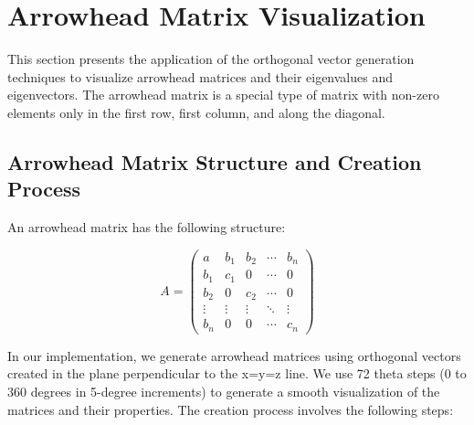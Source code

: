 \newpage\section{Arrowhead Matrix Visualization}

This section presents the application of the orthogonal vector generation techniques to visualize arrowhead matrices and their eigenvalues and eigenvectors. The arrowhead matrix is a special type of matrix with non-zero elements only in the first row, first column, and along the diagonal.

\subsection{Arrowhead Matrix Structure and Creation Process}

An arrowhead matrix has the following structure:

\begin{equation}
A = 
\begin{pmatrix}
a & b_1 & b_2 & \cdots & b_n \\
b_1 & c_1 & 0 & \cdots & 0 \\
b_2 & 0 & c_2 & \cdots & 0 \\
\vdots & \vdots & \vdots & \ddots & \vdots \\
b_n & 0 & 0 & \cdots & c_n
\end{pmatrix}
\end{equation}

In our implementation, we generate arrowhead matrices using orthogonal vectors created in the plane perpendicular to the x=y=z line. We use 72 theta steps (0 to 360 degrees in 5-degree increments) to generate a smooth visualization of the matrices and their properties. The creation process involves the following steps:

